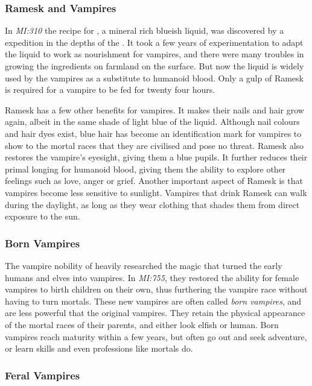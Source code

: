 \subsubsection{Ramesk and Vampires}

In \emph{MI:310} the recipe for , a mineral rich blueish
liquid, was discovered by a  expedition in the depths of
the . It took a few years of experimentation to
adapt the liquid to work as nourishment for vampires, and there were many
troubles in growing the ingredients on farmland on the surface. But now the
liquid is widely used by the vampires as a substitute to humanoid blood. Only
a gulp of Ramesk is required for a vampire to be fed for twenty four hours.

Ramesk has a few other benefits for vampires. It makes their nails and hair
grow again, albeit in the same shade of light blue of the liquid. Although
nail colours and hair dyes exist, blue hair has become an identification mark
for vampires to show to the mortal races that they are civilised and pose no
threat. Ramesk also restores the vampire's eyesight, giving them a blue
pupils. It further reduces their primal longing for humanoid blood, giving
them the ability to explore other feelings such as love, anger or
grief. Another important aspect of Ramesk is that vampires become less
sensitive to sunlight. Vampires that drink Ramesk can walk during the
daylight, as long as they wear clothing that shades them from direct exposure
to the sun.

\subsubsection{Born Vampires}
\label{sec:Born Vampires}

The vampire nobility of  heavily researched the magic
that turned the early humans and elves into vampires. In \emph{MI:755}, they
restored the ability for female vampires to birth children on their own, thus
furthering the vampire race without having to turn mortals. These new vampires
are often called \emph{born vampires}, and are less powerful that the original
vampires. They retain the physical appearance of the mortal races of their
parents, and either look elfish or human. Born vampires reach maturity within
a few years, but often go out and seek adventure, or learn skills and even
professions like mortals do.

\subsubsection{Feral Vampires}
\label{sec:Feral Vampires}

